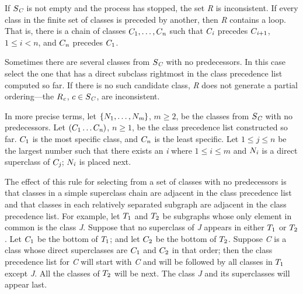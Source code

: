 If $S_ {\hbox{\scriptsize\it C}}$ is not empty and the process has stopped, the set \emph{R} is
inconsistent. If every class in the finite set of classes is preceded
by another, then \emph{R} contains a loop. That is, there is a chain of
classes $C_ 1,\ldots,C_ {\hbox{\scriptsize\it n}}$
such that $C_ {\hbox{\scriptsize\it i}}$ precedes
$C_{\hbox{\scriptsize\it i}+1}$, $1\leq i<n$,
and $C_ {\hbox{\scriptsize\it n}}$ precedes $C_ 1$.

Sometimes there are several classes from $S_ {\hbox{\scriptsize\it C}}$ with no
predecessors.  In this case select the one that has a direct
subclass rightmost in the class precedence list computed so far.
If there is no
such candidate class, \emph{R} does not generate a partial ordering---the
$R_ {\hbox{\scriptsize\it c}}$, $c\in S_ {\hbox{\scriptsize\it C}}$, are inconsistent.

In more precise terms, let $\{N_ 1,\ldots,N_ {\hbox{\scriptsize\it m}}\}$,
$m\geq 2$, be
the classes from $S_ {\hbox{\scriptsize\it C}}$ with no predecessors.  Let $(C_
1\ldots C_ {\hbox{\scriptsize\it n}})$, $n\geq 1$, be the class precedence list
constructed so far.  $C_ 1$ is the most specific class, and $C_
n$ is the least specific.  Let $1\leq j\leq n$ be the largest number
such that there exists an \emph{i} where $1\leq i\leq m$ and
$N_ {\hbox{\scriptsize\it i}}$
is a direct superclass of $C_ {\hbox{\scriptsize\it j}}$;
$N_ {\hbox{\scriptsize\it i}}$ is placed next.

The effect of this rule for selecting from a set of classes with no
predecessors is that classes in a simple superclass chain are
adjacent in the class precedence list and that classes in each
relatively separated subgraph are adjacent in the class
precedence list. For example, let $T_ 1$ and $T_ 2$ be subgraphs
whose only element in common is the class \emph{J}. Suppose
that no superclass of \emph{J} appears in either $T_ 1$ or $T_ 2$.
Let $C_ 1$ be the bottom of $T_ 1$; and let $C_ 2$ be the
bottom of $T_ 2$.  Suppose \emph{C} is a class whose direct superclasses
are $C_ 1$ and $C_ 2$ in that order; then the class precedence
list for \emph{C} will start with \emph{C} and will be followed by all classes
in $T_ 1$ except \emph{J}. All the classes of $T_ 2$ will be next.
The class \emph{J} and its superclasses will appear last.


